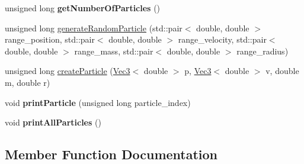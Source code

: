 \begin{DoxyCompactItemize}
\item 
\hypertarget{classParticle_a06514801da39b213dc9d408d40e2adc1}{}unsigned long {\bfseries get\+Number\+Of\+Particles} ()\label{classParticle_a06514801da39b213dc9d408d40e2adc1}

\item 
unsigned long \hyperlink{classParticle_af9d4982b196dbcaf9cdf59377dd5b2ee}{generate\+Random\+Particle} (std\+::pair$<$ double, double $>$ range\+\_\+position, std\+::pair$<$ double, double $>$ range\+\_\+velocity, std\+::pair$<$ double, double $>$ range\+\_\+mass, std\+::pair$<$ double, double $>$ range\+\_\+radius)
\item 
unsigned long \hyperlink{classParticle_ab23d7609a8b229bae8756c1b45b167fb}{create\+Particle} (\hyperlink{classVec3}{Vec3}$<$ double $>$ p, \hyperlink{classVec3}{Vec3}$<$ double $>$ v, double m, double r)
\item 
\hypertarget{classParticle_ac68f9be7c033bc006fac8b90b31fad6b}{}void {\bfseries print\+Particle} (unsigned long particle\+\_\+index)\label{classParticle_ac68f9be7c033bc006fac8b90b31fad6b}

\item 
\hypertarget{classParticle_a9acb129d789df24580508e20816f2922}{}void {\bfseries print\+All\+Particles} ()\label{classParticle_a9acb129d789df24580508e20816f2922}

\end{DoxyCompactItemize}


\subsection{Member Function Documentation}
\hypertarget{classParticle_ab23d7609a8b229bae8756c1b45b167fb}{}
